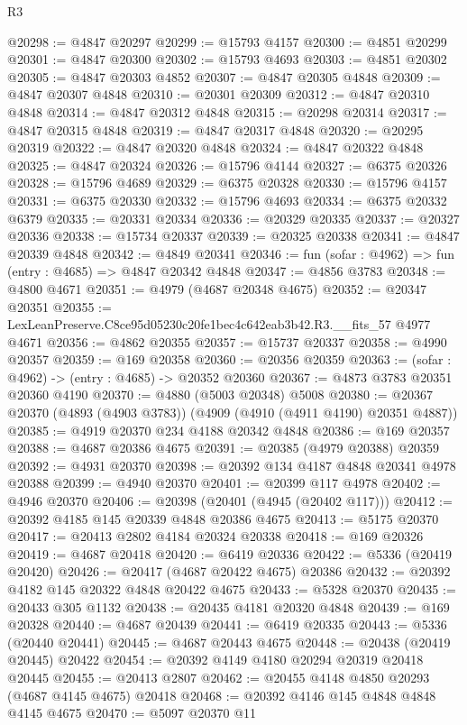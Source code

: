 \begin{lexlean}{R3}
\begin{coremodule}
@20298 := @4847 @20297
@20299 := @15793 @4157
@20300 := @4851 @20299
@20301 := @4847 @20300
@20302 := @15793 @4693
@20303 := @4851 @20302
@20305 := @4847 @20303 @4852
@20307 := @4847 @20305 @4848
@20309 := @4847 @20307 @4848
@20310 := @20301 @20309
@20312 := @4847 @20310 @4848
@20314 := @4847 @20312 @4848
@20315 := @20298 @20314
@20317 := @4847 @20315 @4848
@20319 := @4847 @20317 @4848
@20320 := @20295 @20319
@20322 := @4847 @20320 @4848
@20324 := @4847 @20322 @4848
@20325 := @4847 @20324
@20326 := @15796 @4144
@20327 := @6375 @20326
@20328 := @15796 @4689
@20329 := @6375 @20328
@20330 := @15796 @4157
@20331 := @6375 @20330
@20332 := @15796 @4693
@20334 := @6375 @20332 @6379
@20335 := @20331 @20334
@20336 := @20329 @20335
@20337 := @20327 @20336
@20338 := @15734 @20337
@20339 := @20325 @20338
@20341 := @4847 @20339 @4848
@20342 := @4849 @20341
@20346 := fun (sofar : @4962) => fun (entry : @4685) => @4847 @20342 @4848
@20347 := @4856 @3783
@20348 := @4800 @4671
@20351 := @4979 (@4687 @20348 @4675)
@20352 := @20347 @20351
@20355 := LexLeanPreserve.C8ce95d05230c20fe1bec4c642eab3b42.R3.__fits_57 @4977 @4671
@20356 := @4862 @20355
@20357 := @15737 @20337
@20358 := @4990 @20357
@20359 := @169 @20358
@20360 := @20356 @20359
@20363 := (sofar : @4962) -> (entry : @4685) -> @20352 @20360
@20367 := @4873 @3783 @20351 @20360 @4190
@20370 := @4880 (@5003 @20348) @5008
@20380 := @20367 @20370 (@4893 (@4903 @3783)) (@4909 (@4910 (@4911 @4190) @20351 @4887))
@20385 := @4919 @20370 @234 @4188 @20342 @4848
@20386 := @169 @20357
@20388 := @4687 @20386 @4675
@20391 := @20385 (@4979 @20388) @20359
@20392 := @4931 @20370
@20398 := @20392 @134 @4187 @4848 @20341 @4978 @20388
@20399 := @4940 @20370
@20401 := @20399 @117 @4978
@20402 := @4946 @20370
@20406 := @20398 (@20401 (@4945 (@20402 @117)))
@20412 := @20392 @4185 @145 @20339 @4848 @20386 @4675
@20413 := @5175 @20370
@20417 := @20413 @2802 @4184 @20324 @20338
@20418 := @169 @20326
@20419 := @4687 @20418
@20420 := @6419 @20336
@20422 := @5336 (@20419 @20420)
@20426 := @20417 (@4687 @20422 @4675) @20386
@20432 := @20392 @4182 @145 @20322 @4848 @20422 @4675
@20433 := @5328 @20370
@20435 := @20433 @305 @1132
@20438 := @20435 @4181 @20320 @4848
@20439 := @169 @20328
@20440 := @4687 @20439
@20441 := @6419 @20335
@20443 := @5336 (@20440 @20441)
@20445 := @4687 @20443 @4675
@20448 := @20438 (@20419 @20445) @20422
@20454 := @20392 @4149 @4180 @20294 @20319 @20418 @20445
@20455 := @20413 @2807
@20462 := @20455 @4148 @4850 @20293 (@4687 @4145 @4675) @20418
@20468 := @20392 @4146 @145 @4848 @4848 @4145 @4675
@20470 := @5097 @20370 @11

\end{coremodule}
\end{lexlean}
